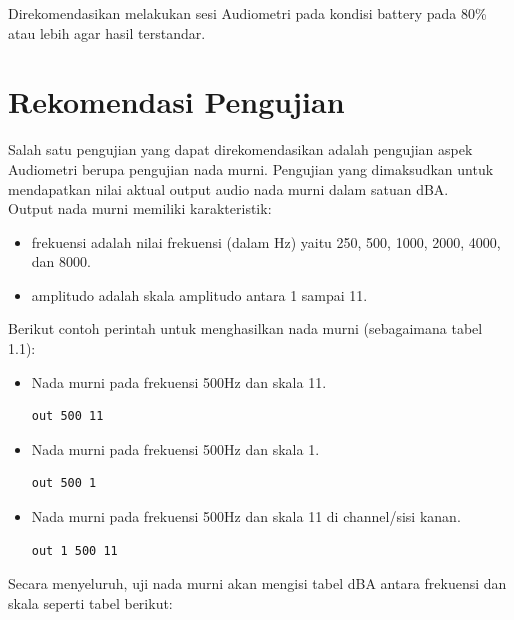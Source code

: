 \documentclass[12pt]{book}
\begin{document}
	Direkomendasikan melakukan sesi Audiometri pada kondisi battery pada 80\% atau lebih agar hasil terstandar.

	\newpage
    \section{Rekomendasi Pengujian}

    Salah satu pengujian yang dapat direkomendasikan adalah pengujian aspek Audiometri berupa pengujian nada murni.
    Pengujian yang dimaksudkan untuk mendapatkan nilai aktual output audio nada murni dalam satuan dBA.\\

    Output nada murni memiliki karakteristik:
    \begin{itemize}
    	\item frekuensi adalah nilai frekuensi (dalam Hz) yaitu 250, 500, 1000, 2000, 4000, dan 8000.
    	\item amplitudo adalah skala amplitudo antara 1 sampai 11.
    \end{itemize}

	Berikut contoh perintah untuk menghasilkan nada murni (sebagaimana tabel 1.1):

	\begin{itemize}
		\item Nada murni pada frekuensi 500Hz dan skala 11.
    	\begin{verbatim}
out 500 11
		\end{verbatim}

		\item Nada murni pada frekuensi 500Hz dan skala 1.
		\begin{verbatim}
out 500 1
		\end{verbatim}

		\item Nada murni pada frekuensi 500Hz dan skala 11 di channel/sisi kanan.
		\begin{verbatim}
out 1 500 11
		\end{verbatim}
	\end{itemize}

	Secara menyeluruh, uji nada murni akan mengisi tabel dBA antara frekuensi dan skala seperti tabel berikut:
\end{document}
